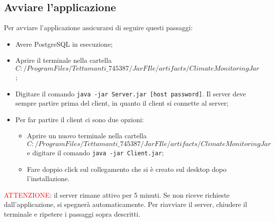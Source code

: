 \subsection{Avviare l'applicazione}
Per avviare l'applicazione assicurarsi di seguire questi passaggi:
\begin{itemize}
    \item Avere PostgreSQL in esecuzione;
    \item Aprire il terminale nella cartella\\ \texttt{$C:/Program Files/Tettamanti\_745387/JarFIle/artifacts/ClimateMonitoringJar$};
    \item Digitare il comando \texttt{java -jar Server.jar [host password]}. Il server deve sempre partire prima del client, in quanto il client si connette al server;
    \item Per far partire il client ci sono due opzioni:
    \begin{itemize}
        \item Aprire un nuovo terminale nella cartella\\ \texttt{$C:/Program Files/Tettamanti\_745387/JarFIle/artifacts/ClimateMonitoringJar$} e
        digitare il comando \texttt{java -jar Client.jar};
        \item Fare doppio click sul collegamento che si è creato sul desktop dopo l'installazione.
    \end{itemize}
\end{itemize}

\textcolor{red}{ATTENZIONE}: il server rimane attivo per 5 minuti. Se non riceve richieste dall'applicazione, si spegnerà automaticamente. Per riavviare il server, chiudere il terminale e ripetere i passaggi sopra descritti.


